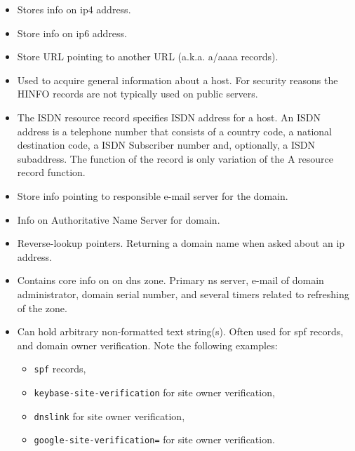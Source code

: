 \begin{itemize}
    \item {}     Stores info on \gls{ip4} address.
    \item {}  Store info on \gls{ip6} address.
    \item {} Store URL pointing to another URL (a.k.a. \gls{a}/\gls{aaaa} records).
    \item {} Used to acquire general information about a host. For security reasons the HINFO records are not typically used on public servers.\cite{DNSRecor50:online}
    \item {}  The ISDN resource record specifies ISDN address for a host. An ISDN address is a telephone number that consists of a country code, a national destination code, a ISDN Subscriber number and, optionally, a ISDN subaddress. The function of the record is only variation of the A resource record function.\cite{DNSRecor50:online}
    \item {}    Store info pointing to responsible e-mail server for the domain.
    \item {}    Info on Authoritative Name Server for domain.
    \item {}   Reverse-lookup pointers. Returning a domain name when asked about an \gls{ip} address.
    \item {}   Contains core info on on \gls{dns} zone. Primary \gls{ns} server, e-mail of domain administrator, domain serial number, and several timers related to refreshing of the zone.
    \item {}   Can hold arbitrary non-formatted text string(s). Often used for \gls{spf} records, and domain owner verification. Note the following examples:
    \begin{itemize}
        \item \texttt{\gls{spf}} records,
        \item \texttt{keybase-site-verification} for site owner verification,
        \item \texttt{dnslink} for site owner verification,
        \item \texttt{google-site-verification=} for site owner verification.
    \end{itemize}
\end{itemize}

\pagebreak

